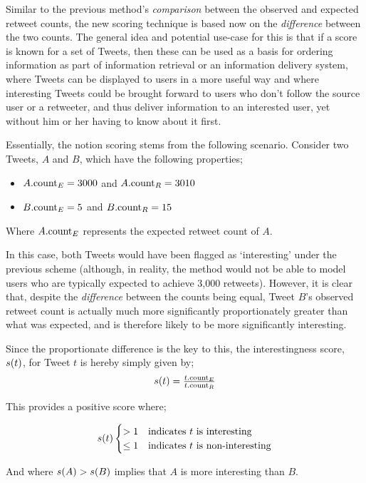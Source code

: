 Similar to the previous method's \textit{comparison} between the observed and expected retweet counts, the new scoring technique is based now on the \textit{difference} between the two counts. The general idea and potential use-case for this is that if a score is known for a set of Tweets, then these can be used as a basis for ordering information as part of information retrieval or an information delivery system, where Tweets can be displayed to users in a more useful way and where interesting Tweets could be brought forward to users who don't follow the source user or a retweeter, and thus deliver information to an interested user, yet without him or her having to know about it first.

Essentially, the notion scoring stems from the following scenario. Consider two Tweets, $A$ and $B$, which have the following properties;
\begin{itemize}
    \item $A.\textrm{count}_E = 3000$ and $A.\textrm{count}_R = 3010$
    \item $B.\textrm{count}_E = 5$ and $B.\textrm{count}_R = 15$
\end{itemize}
Where $A.\textrm{count}_E$ represents the expected retweet count of $A$.

In this case, both Tweets would have been flagged as `interesting' under the previous scheme (although, in reality, the method would not be able to model users who are typically expected to achieve 3,000 retweets). However, it is clear that, despite the \textit{difference} between the counts being equal, Tweet $B$'s observed retweet count is actually much more significantly proportionately greater than what was expected, and is therefore likely to be more significantly interesting.

Since the proportionate difference is the key to this, the interestingness score, $s(t)$, for Tweet $t$ is hereby simply given by;
\[
\begin{array}{cc}
 s(t) = \frac{t.\textrm{count}_E}{t.\textrm{count}_R}
\end{array}
\]

This provides a positive score where;

\[
s(t)
	\begin{cases}
		> 1		&	\text{indicates } t	\text{ is interesting} \\
		\leq 1	&	\text{indicates } t	\text{ is non-interesting}
  \end{cases}
\]

And where $s(A) > s(B)$ implies that $A$ is more interesting than $B$.

